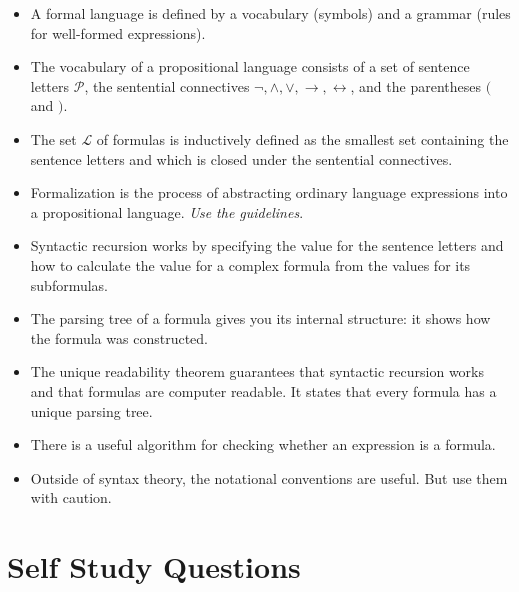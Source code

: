 \begin{itemize}

	\item A formal language is defined by a vocabulary (symbols) and a grammar (rules for well-formed expressions).
	
	\item The vocabulary of a propositional language consists of a set of sentence letters $\mathcal{P}$, the sentential connectives $\neg,\land,\lor,\to,\leftrightarrow$, and the parentheses $($ and $)$.
	
	\item The set $\mathcal{L}$ of formulas is inductively defined as the smallest set containing the sentence letters and which is closed under the sentential connectives. 
	
	\item Formalization is the process of abstracting ordinary language expressions into a propositional language. \emph{Use the guidelines}.
	
	\item Syntactic recursion works by specifying the value for the sentence letters and how to calculate the value for a complex formula from the values for its subformulas.
	
	\item The parsing tree of a formula gives you its internal structure: it shows how the formula was constructed.
	
	\item The unique readability theorem guarantees that syntactic recursion works and that formulas are computer readable. It states that every formula has a unique parsing tree.
	
	\item There is a useful algorithm for checking whether an expression is a formula.
	
	\item Outside of syntax theory, the notational conventions are useful. But use them with caution.

\end{itemize}

\section{Self Study Questions}

